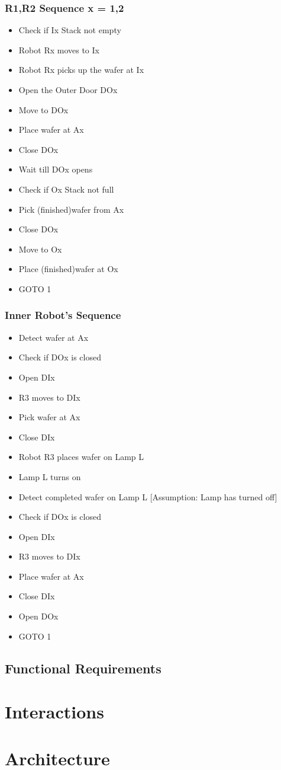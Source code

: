 \documentclass[a4paper,12pt]{article}
\begin{document}
\subsubsection {R1,R2 Sequence  x = 1,2 }
\begin{itemize}
\item Check if Ix Stack not empty
\item Robot Rx moves to Ix
\item Robot Rx picks up the wafer at Ix 
\item Open the Outer Door DOx
\item Move to DOx
\item Place wafer at Ax
\item Close DOx
\item Wait till DOx opens
\item Check if Ox Stack not full
\item Pick (finished)wafer from Ax
\item Close DOx
\item Move to Ox
\item Place (finished)wafer at Ox
\item GOTO 1
\end{itemize}

\subsubsection {Inner Robot's Sequence}
\begin{itemize}
\item Detect wafer at Ax
\item Check if DOx is closed
\item Open DIx
\item R3 moves to DIx
\item Pick wafer at Ax
\item Close DIx
\item Robot R3 places wafer on Lamp L
\item Lamp L turns on
\item Detect completed wafer on Lamp L [Assumption: Lamp has turned off]
\item Check if DOx is closed
\item Open DIx
\item R3 moves to DIx
\item Place wafer at Ax
\item Close DIx
\item Open DOx
\item GOTO 1
\end{itemize}

\subsection{Functional Requirements}

\section{Interactions} 

\section{Architecture}
\end{document}
